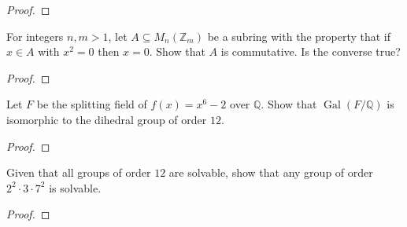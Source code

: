 \documentclass{article}
\newenvironment{problem}[2][Problem]{\begin{trivlist}
\item[\hskip \labelsep {\bfseries #1}\hskip \labelsep {\bfseries #2.}]}{\end{trivlist}}
\newcommand{\Q}{\mathbb Q}
\newcommand{\Gal}{\operatorname{Gal}}
\begin{document}
\begin{proof}
\end{proof}
\pagebreak

\begin{problem}{4}
  For integers $n ,m > 1$, let $A \subseteq M_n(\mathbb Z_m)$ be a subring with the property that if $x \in A$ with $x^2 = 0$ then $x = 0$. Show that $A$ is commutative. Is the converse true?
\end{problem}

\begin{proof}
\end{proof}
\pagebreak

\begin{problem}{5}
  Let $F$ be the splitting field of $f(x) = x^6 - 2$ over $\Q$. Show that $\Gal(F/\Q)$ is isomorphic to the dihedral group of order $12$.
\end{problem}

\begin{proof}
\end{proof}
\pagebreak

\begin{problem}{6}
  Given that all groups of order $12$ are solvable, show that any group of order $2^2 \cdot 3 \cdot 7^2$ is solvable.
\end{problem}

\begin{proof}
\end{proof}
\end{document}
